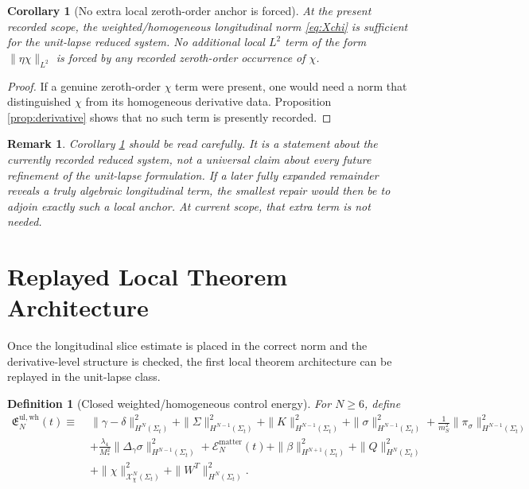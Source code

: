 \documentclass[11pt]{article}
\newtheorem{definition}{Definition}
\newtheorem{remark}{Remark}
\newtheorem{corollary}{Corollary}
\begin{document}
\begin{corollary}[No extra local zeroth-order anchor is forced]
\label{cor:noanchor}
At the present recorded scope, the weighted/homogeneous longitudinal norm \eqref{eq:Xchi} is sufficient for the unit-lapse reduced system. No additional local \(L^2\) term of the form \(\|\eta\chi\|_{L^2}\) is forced by any recorded zeroth-order occurrence of \(\chi\).
\end{corollary}

\begin{proof}
If a genuine zeroth-order \(\chi\) term were present, one would need a norm that distinguished \(\chi\) from its homogeneous derivative data. Proposition \ref{prop:derivative} shows that no such term is presently recorded.
\end{proof}

\begin{remark}
Corollary \ref{cor:noanchor} should be read carefully. It is a statement about the currently recorded reduced system, not a universal claim about every future refinement of the unit-lapse formulation. If a later fully expanded remainder reveals a truly algebraic longitudinal term, the smallest repair would then be to adjoin exactly such a local anchor. At current scope, that extra term is not needed.
\end{remark}

\section{Replayed Local Theorem Architecture}

Once the longitudinal slice estimate is placed in the correct norm and the derivative-level structure is checked, the first local theorem architecture can be replayed in the unit-lapse class.

\begin{definition}[Closed weighted/homogeneous control energy]
For \(N\ge 6\), define
\begin{align}
\mathfrak E_N^{\mathrm{ul,wh}}(t)
\equiv\;&
\|\gamma-\delta\|_{H^N(\Sigma_t)}^2
+ \|\Sigma\|_{H^{N-1}(\Sigma_t)}^2
+ \|K\|_{H^{N-1}(\Sigma_t)}^2
+ \|\sigma\|_{H^{N-1}(\Sigma_t)}^2
+ \frac{1}{m_S^2}\|\pi_\sigma\|_{H^{N-1}(\Sigma_t)}^2
\nonumber\\
&+
\frac{\lambda_4}{M_*^2}\|\Delta_\gamma \sigma\|_{H^{N-1}(\Sigma_t)}^2
+ \mathcal E_N^{\mathrm{matter}}(t)
+ \|\beta\|_{H^{N+1}(\Sigma_t)}^2
+ \|Q\|_{H^N(\Sigma_t)}^2
\nonumber\\
&+
\|\chi\|_{\mathcal X_\chi^N(\Sigma_t)}^2
+ \|W^T\|_{H^N(\Sigma_t)}^2.
\label{eq:Ewh}
\end{align}
\end{definition}
\end{document}
